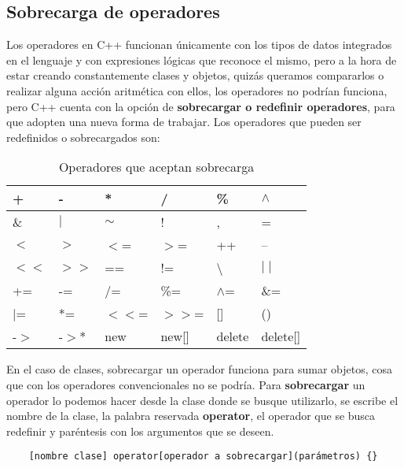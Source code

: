 \subsection{Sobrecarga de operadores}

Los operadores en C++ funcionan únicamente con los tipos de datos integrados en el lenguaje y con expresiones lógicas que reconoce el mismo, pero a la hora de estar creando constantemente clases y objetos, quizás queramos compararlos o realizar alguna acción aritmética con ellos, los operadores no podrían funciona, pero C++ cuenta con la opción de \textbf{sobrecargar o redefinir operadores}, para que adopten una nueva forma de trabajar. Los operadores que pueden ser redefinidos o sobrecargados son:
\begin{table}[H]
    \begin{center}
        \caption{Operadores que aceptan sobrecarga}
        \label{tab: 8}
        \begin{tabular}{|l|l|l|l|l|l|}
            \hline
            +       & -         & *         & /     & \%                & $\wedge$ \\
            \hline
            \&      & $\mid$    & $\sim$    & !     & ,                 & = \\
            \hline
            $<$     & $>$       & $<$=      & $>$=  & ++                & -- \\
            \hline
            $<<$    & $>>$      & ==        & !=    & \textbackslash    & $\mid\mid$ \\
            \hline
            +=      & -=        & /=        & \%=   & $\wedge$=         & \&= \\
            \hline
            $\mid$= & *=        & $<<$=     & $>>$= & []                & () \\
            \hline
            -$>$    & -$>$*     & new       & new[] & delete            & delete[] \\
            \hline
        \end{tabular}
    \end{center}
\end{table}

En el caso de clases, sobrecargar un operador funciona para sumar objetos, cosa que con los operadores convencionales no se podría. Para \textbf{sobrecargar} un operador lo podemos hacer desde la clase donde se busque utilizarlo, se escribe el nombre de la clase, la palabra reservada \textbf{operator}, el operador que se busca redefinir y paréntesis con los argumentos que se deseen.
\begin{lstlisting}
    [nombre clase] operator[operador a sobrecargar](parámetros) {}
\end{lstlisting}

